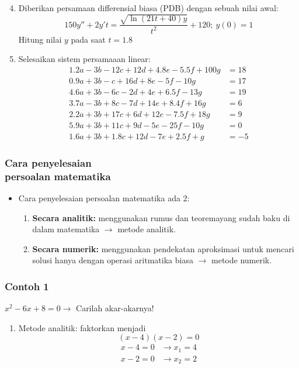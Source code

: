 \documentclass[pdflatex,compress]{beamer}
\begin{document}
\begin{frame}
	\begin{enumerate}
		\setcounter{enumi}{3}
		\item Diberikan persamaan differensial biasa (PDB) dengan sebuah nilai awal:
		\[ 150y'' + 2y't = \frac{\sqrt{\ln(21t+40)y}}{t^2} + 120;~y(0)=1 \]
		Hitung nilai $ y $ pada saat $ t = 1.8 $
	\end{enumerate}
\end{frame}

\begin{frame}
	\begin{enumerate}
		\setcounter{enumi}{4}
		\item Selesaikan sistem persamaaan linear:
		\begin{align*}
			1.2a - 3b -  12c + 12d + 4.8e - 5.5f	+ 100g  &= 18 \\
			0.9a + 3b -    c + 16d +   8e -   5f	-  10g  &= 17 \\
			4.6a + 3b -   6c -  2d +   4e + 6.5f	-  13g  &= 19 \\
			3.7a - 3b +   8c -  7d +  14e + 8.4f	+  16g  &=  6 \\
			2.2a + 3b +  17c +  6d +  12e - 7.5f	+  18g  &=  9 \\
			5.9a + 3b +  11c +  9d -   5e -  25f	-  10g  &=  0 \\
			1.6a + 3b + 1.8c + 12d -   7e + 2.5f	+    g  &= -5
		\end{align*}
	\end{enumerate}
\end{frame}

\begin{frame}
\frametitle{Cara penyelesaian \\
	persoalan matematika}
	\begin{itemize}
		\item Cara penyelesaian persoalan matematika ada 2:
		\begin{enumerate}
			\item \textbf{Secara analitik:} menggunakan rumus dan teoremayang sudah baku di dalam matematika $\rightarrow$ metode analitik.
			\item \textbf{Secara numerik:} menggunakan pendekatan aproksimasi untuk mencari solusi hanya dengan operasi aritmatika biasa $\rightarrow$ metode numerik.
		\end{enumerate}
	\end{itemize}
\end{frame}

\begin{frame}
	\frametitle{Contoh 1}
	$ x^2 - 6x + 8 = 0 \rightarrow $ Carilah akar-akarnya! \\
	\begin{enumerate}
		\item Metode analitik: faktorkan menjadi $$ (x-4)(x-2) = 0 $$
			\begin{align*}
				x - 4 = 0 &\rightarrow x_1 = 4 \\
				x - 2 = 0 &\rightarrow x_2 = 2
			\end{align*}
	\end{enumerate}
\end{frame}
\end{document}
